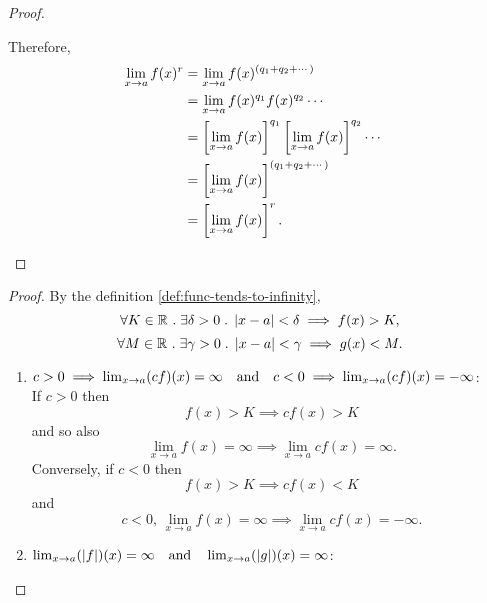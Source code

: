 \documentclass[../MathsNotesBase.tex]{subfiles}
\begin{document}
{\begin{proof}
\begin{enumerate}[label=(\roman*)]
{					Therefore,
					\begin{align*}
					\lim_{x \to a} f(x)^r &= \lim_{x \to a} f(x)^{(q_1 + q_2 + \cdots)} \\
					&= \lim_{x \to a} f(x)^{q_1}f(x)^{q_2}\cdots &\text{\scriptsize{}} \\
					&= \left[\lim_{x \to a} f(x)\right]^{q_1}\left[\lim_{x \to a} f(x)\right]^{q_2}\cdots &\text{\scriptsize{}} \\
					&= \left[\lim_{x \to a} f(x)\right]^{(q_1 + q_2 + \cdots)}\\
					&= \left[\lim_{x \to a} f(x)\right]^r.
					\end{align*}
				}
			\end{enumerate}
		\end{proof}
	
		\bigskip
		\begin{proof}\nl
			By the definition \ref{def:func-tends-to-infinity},
			\[ \forall K \in \mathbb{R}^{} \;.\; \exists \delta > 0 \;.\; \left\lvert x - a\right\rvert < \delta \implies f(x) > K, \]
			\[ \forall M \in \mathbb{R}^{} \;.\; \exists \gamma > 0 \;.\; \left\lvert x - a\right\rvert < \gamma \implies g(x) < M. \]
			\medskip
			\begin{enumerate}[label=(\roman*)]
				\item{${ c > 0 \implies \lim_{x \to a} (cf)(x) = \infty \hspace{10pt}\text{and}\hspace{10pt} c < 0 \implies \lim_{x \to a} (cf)(x) = -\infty }$:\\
				
					If ${ c > 0 }$ then
					\[ f(x) > K \implies cf(x) > K \]
					and so also
					\[ \lim_{x \to a} f(x) = \infty \implies \lim_{x \to a} cf(x) = \infty. \]
					Conversely, if ${ c < 0 }$ then
					\[ f(x) > K \implies cf(x) < K \]
					and
					\[ c < 0, \, \lim_{x \to a} f(x) = \infty \implies \lim_{x \to a} cf(x) = -\infty. \]
				}
				\medskip
				\item{${ \lim_{x \to a} (\left\lvert f\right\rvert)(x) = \infty \hspace{10pt}\text{and}\hspace{10pt} \lim_{x \to a} (\left\lvert g\right\rvert)(x) = \infty }$:\\
				
}
\end{enumerate}
\end{proof}}
\end{document}
